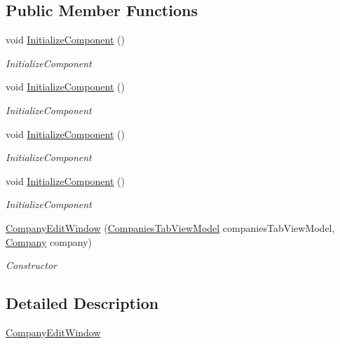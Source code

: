 \subsection*{Public Member Functions}
\begin{DoxyCompactItemize}
\item 
void \hyperlink{class_baudi_1_1_client_1_1_view_1_1_edit_windows_1_1_company_edit_window_add8da36a1aa74ce70d9b0612800739b9}{Initialize\+Component} ()
\begin{DoxyCompactList}\small\item\em Initialize\+Component \end{DoxyCompactList}\item 
void \hyperlink{class_baudi_1_1_client_1_1_view_1_1_edit_windows_1_1_company_edit_window_add8da36a1aa74ce70d9b0612800739b9}{Initialize\+Component} ()
\begin{DoxyCompactList}\small\item\em Initialize\+Component \end{DoxyCompactList}\item 
void \hyperlink{class_baudi_1_1_client_1_1_view_1_1_edit_windows_1_1_company_edit_window_add8da36a1aa74ce70d9b0612800739b9}{Initialize\+Component} ()
\begin{DoxyCompactList}\small\item\em Initialize\+Component \end{DoxyCompactList}\item 
void \hyperlink{class_baudi_1_1_client_1_1_view_1_1_edit_windows_1_1_company_edit_window_add8da36a1aa74ce70d9b0612800739b9}{Initialize\+Component} ()
\begin{DoxyCompactList}\small\item\em Initialize\+Component \end{DoxyCompactList}\item 
\hyperlink{class_baudi_1_1_client_1_1_view_1_1_edit_windows_1_1_company_edit_window_a80ca6d307af850840f66e9376133634c}{Company\+Edit\+Window} (\hyperlink{class_baudi_1_1_client_1_1_view_models_1_1_tabs_view_models_1_1_companies_tab_view_model}{Companies\+Tab\+View\+Model} companies\+Tab\+View\+Model, \hyperlink{class_baudi_1_1_d_a_l_1_1_models_1_1_company}{Company} company)
\begin{DoxyCompactList}\small\item\em Constructor \end{DoxyCompactList}\end{DoxyCompactItemize}


\subsection{Detailed Description}
\hyperlink{class_baudi_1_1_client_1_1_view_1_1_edit_windows_1_1_company_edit_window}{Company\+Edit\+Window} 




